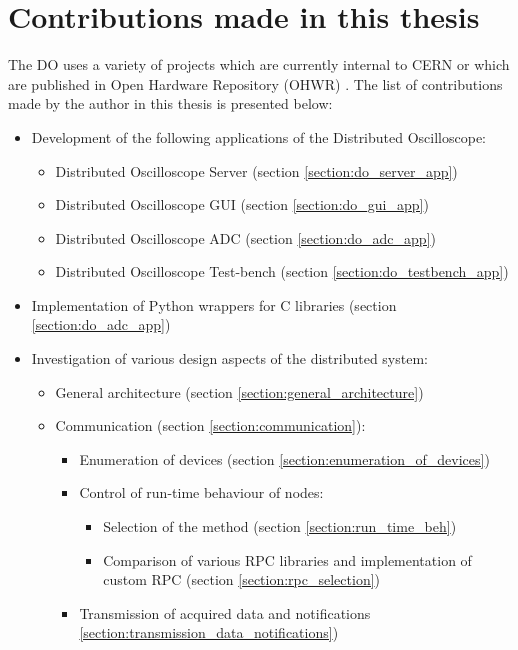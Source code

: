 \section{Contributions made in this thesis}
The DO uses a variety of projects which are currently internal to CERN or which are published in Open Hardware Repository (OHWR) \cite{ohwr}. The list of contributions made by the author in this thesis is presented below:
\begin{itemize}
    \item Development of the following applications of the Distributed Oscilloscope:
        \begin{itemize}
            \item Distributed Oscilloscope Server (section \ref{section:do_server_app})
            \item Distributed Oscilloscope GUI (section \ref{section:do_gui_app})
            \item Distributed Oscilloscope ADC (section \ref{section:do_adc_app})
            \item Distributed Oscilloscope Test-bench (section \ref{section:do_testbench_app})
        \end{itemize}
    \item Implementation of Python wrappers for C libraries (section \ref{section:do_adc_app})
    \item Investigation of various design aspects of the distributed system:
        \begin{itemize}
            \item General architecture (section \ref{section:general_architecture})
            \item Communication (section \ref{section:communication}):
                \begin{itemize}
                    \item Enumeration of devices (section \ref{section:enumeration_of_devices})
                    \item Control of run-time behaviour of nodes:
                        \begin{itemize}
                            \item Selection of the method (section \ref{section:run_time_beh})
                            \item Comparison of various RPC libraries and implementation of custom RPC (section \ref{section:rpc_selection})
                        \end{itemize}
                    \item Transmission of acquired data and notifications \ref{section:transmission_data_notifications})

\end{itemize}
\end{itemize}
\end{itemize}
